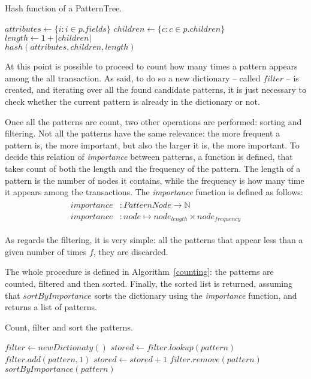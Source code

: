 \documentclass{acm_proc_article-sp-sigmod09}
\begin{document}
\begin{algorithm}
\caption{Hash function of a PatternTree.}
\label{hash}
\begin{algorithmic}[1]
\State $attributes \gets \{i : i \in p.fields\}$
\State $children \gets \{c : c \in p.children\}$
\State $length \gets 1 + |children|$ \\
\Return $hash(attributes, children, length)$
\EndFunction
\end{algorithmic}
\end{algorithm}

At this point is possible to proceed to count how many times a pattern appears among the all transaction. As said, to do so a new dictionary -- called $filter$ -- is created, and iterating over all the found candidate patterns, it is just necessary to check whether the current pattern is already in the dictionary or not.

Once all the patterns are count, two other operations are performed: sorting and filtering. Not all the patterns have the same relevance: the more frequent a pattern is, the more important, but also the larger it is, the more important. To decide this relation of \emph{importance} between patterns, a function is defined, that takes count of both the length and the frequency of the pattern. The length of a pattern is the number of nodes it contains, while the frequency is how many time it appears among the transactions. The \emph{importance} function is defined as follows:
\begin{gather}
\begin{split}
importance & \colon PatternNode \to \mathbb{N} \\
importance & \colon node \mapsto node_{length} \times node_{frequency}
\end{split}
\end{gather}

As regards the filtering, it is very simple: all the patterns that appear less than a given number of times $f$, they are discarded.

The whole procedure is defined in Algorithm~\ref{counting}: the patterns are counted, filtered and then sorted. Finally, the sorted list is returned, assuming that $sortByImportance$ sorts the dictionary using the \emph{importance} function, and returns a list of patterns.

\begin{algorithm}
\caption{Count, filter and sort the patterns.}
\label{counting}
\begin{algorithmic}[1]
\State $filter \gets new Dictionaty()$
	\State $stored \gets filter.lookup(pattern)$
		\State $filter.add(pattern, 1)$
	\Else
		\State $stored \gets stored + 1$
	\EndIf
\EndFor
{}
		\State $filter.remove(pattern)$
	\EndIf
\EndFor
\Return $sortByImportance(pattern)$
\EndFunction
\end{algorithmic}
\end{algorithm}
\end{document}
